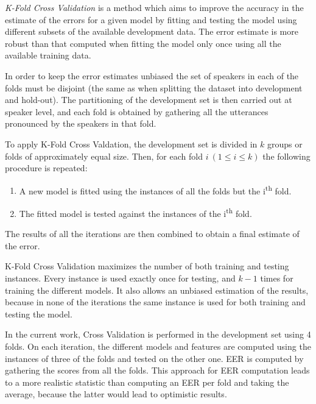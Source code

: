 \textit{K-Fold Cross Validation} \cite{svm_jwht}
is a method which aims to improve the accuracy in the
estimate of the errors for a given model by fitting and testing the model using different
subsets of the available development data. The error estimate is more robust than
that computed when fitting the model only once using all the available training data.

In order to keep the error estimates unbiased
the set of speakers in each of the folds must be disjoint (the same as
when splitting the dataset into development and hold-out).
The partitioning of the development set
is then carried out at speaker level, and each fold is obtained by gathering all the
utterances pronounced by the speakers in that fold.

To apply K-Fold Cross Valdation,
the development set is divided in $k$ groups or folds of approximately equal size.
Then, for each fold $i \ (1 \leq i \leq k)$ the following procedure is repeated:

\begin{enumerate}
  \item A new model is fitted using the instances of all the folds but the i\textsuperscript{th} fold.
  \item The fitted model is tested against the instances of the i\textsuperscript{th} fold.
\end{enumerate}

The results of all the iterations are then combined to obtain a final estimate of the error.

K-Fold Cross Validation maximizes the number of both training and testing instances.
Every instance is used exactly once for testing, and $k-1$ times for training the different
models. It also allows an unbiased estimation of the results,
because in none of the iterations the same instance is used for both training and testing the
model.

In the current work, Cross Validation is performed in the development set using 4 folds.
On each iteration, the different models and features are computed using the instances of
three of the folds and tested on the other one.
EER is computed by gathering the scores from all the folds.
This approach for EER computation leads to a more realistic statistic than computing an EER
per fold and taking the average, because the latter would lead to optimistic results.
